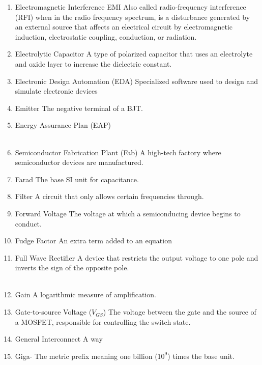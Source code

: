 \documentclass{IEEEtran}
\begin{document}
\begin{enumerate}
\\
\item Electromagnetic Interference {EMI}
\subitem Also called radio-frequency interference (RFI) when in the radio frequency spectrum, is a disturbance generated by an external source that affects an electrical circuit by electromagnetic induction, electrostatic coupling, conduction, or radiation.\\ 
\item Electrolytic Capacitor
  \subitem A type of polarized capacitor that uses an electrolyte and oxide layer to increase the dielectric constant.\\
\item Electronic Design Automation (EDA)
  \subitem Specialized software used to design and simulate electronic devices\\
\item Emitter
  \subitem The negative terminal of a BJT.\\ 
\item Energy Assurance Plan (EAP)
  \subitem \\

\\
\item Semiconductor Fabrication Plant (Fab)
\subitem A high-tech factory where semiconductor devices are manufactured. \\
\item Farad
  \subitem The base SI unit for capacitance. 
\item Filter
  \subitem A circuit that only allows certain frequencies through.
\item Forward Voltage
  \subitem The voltage at which a semiconducing device begins to conduct.\\
\item Fudge Factor
  \subitem An extra term added to an equation
\item Full Wave Rectifier
  \subitem A device that restricts the output voltage to one pole and inverts the sign of the opposite pole.\\

\\
\item Gain
  \subitem A logarithmic measure of amplification.\\
\item Gate-to-source Voltage ($V_{GS}$)
\subitem The voltage between the gate and the source of a MOSFET, responsible for controlling the switch state. \\ 
\item General Interconnect
\subitem A way \\ 
\item Giga-
  \subitem The metric prefix meaning one billion ($10^{9}$) times the base unit.\\


\end{enumerate}
\end{document}
